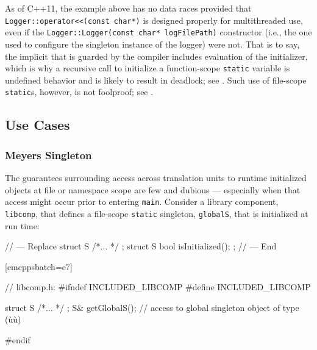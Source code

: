 \noindent As of C++11, the example above has no data races provided that \linebreak%
\lstinline!Logger::operator<<(const!~\lstinline!char*)! is designed properly
for multithreaded use, even if the
\lstinline!Logger::Logger(const!~\lstinline!char*!~\lstinline!logFilePath)!
constructor (i.e., the one used to configure the singleton instance of
the logger) were not. That is to say, the implicit  that is guarded by the compiler includes evaluation of the
initializer, which is why a recursive call to initialize a
function-scope \lstinline!static! variable is undefined behavior and is
likely to result in deadlock; see .
Such use of file-scope \lstinline!static!s, however, is not foolproof; see .

\subsection[Use Cases]{Use Cases}\label{use-cases-functionstatic}

\subsubsection[Meyers Singleton]{Meyers Singleton}\label{meyers-singleton}

The guarantees surrounding access across translation units to runtime
initialized objects at file or namespace scope are few and dubious ---
especially when that access might occur prior to entering \lstinline!main!.
Consider a library component, \lstinline!libcomp!, that defines a
file-scope \lstinline!static! singleton, \lstinline!globalS!, that is
initialized at run time:

\begin{emcppshiddenlisting}[emcppsbatch=e7]
// --- Replace
struct S { /*... */ };
struct S {
  bool isInitialized();
};
// --- End
\end{emcppshiddenlisting}[emcppsbatch=e7]
\begin{emcppslisting}[emcppsbatch=e7]
// libcomp.h:
#ifndef INCLUDED_LIBCOMP
#define INCLUDED_LIBCOMP

struct S { /*... */ };
S& getGlobalS();  // access to global singleton object of type (ù{}ù)

#endif
\end{emcppslisting}

